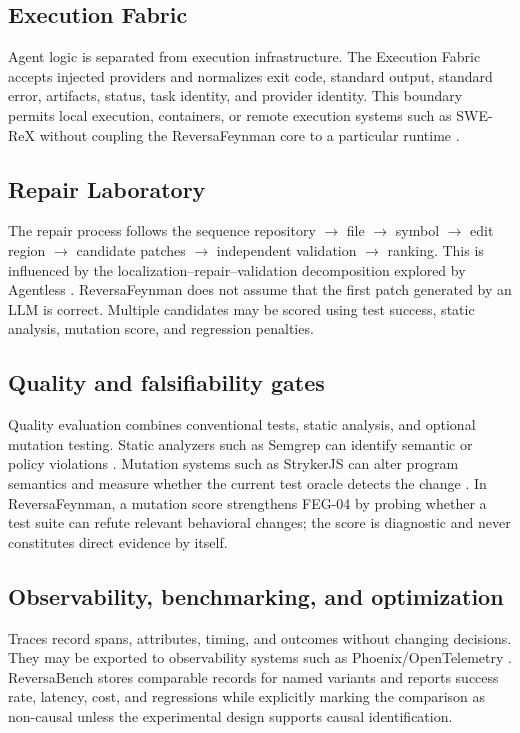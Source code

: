 \subsection{Execution Fabric}

Agent logic is separated from execution infrastructure. The Execution Fabric accepts injected providers and normalizes exit code, standard output, standard error, artifacts, status, task identity, and provider identity. This boundary permits local execution, containers, or remote execution systems such as SWE-ReX without coupling the ReversaFeynman core to a particular runtime \cite{swerex2026}.

\subsection{Repair Laboratory}

The repair process follows the sequence repository $\rightarrow$ file $\rightarrow$ symbol $\rightarrow$ edit region $\rightarrow$ candidate patches $\rightarrow$ independent validation $\rightarrow$ ranking. This is influenced by the localization--repair--validation decomposition explored by Agentless \cite{xia2024agentless}. ReversaFeynman does not assume that the first patch generated by an LLM is correct. Multiple candidates may be scored using test success, static analysis, mutation score, and regression penalties.

\subsection{Quality and falsifiability gates}

Quality evaluation combines conventional tests, static analysis, and optional mutation testing. Static analyzers such as Semgrep can identify semantic or policy violations \cite{semgrep2026}. Mutation systems such as StrykerJS can alter program semantics and measure whether the current test oracle detects the change \cite{stryker2026}. In ReversaFeynman, a mutation score strengthens FEG-04 by probing whether a test suite can refute relevant behavioral changes; the score is diagnostic and never constitutes direct evidence by itself.

\subsection{Observability, benchmarking, and optimization}

Traces record spans, attributes, timing, and outcomes without changing decisions. They may be exported to observability systems such as Phoenix/OpenTelemetry \cite{phoenix2026}. ReversaBench stores comparable records for named variants and reports success rate, latency, cost, and regressions while explicitly marking the comparison as non-causal unless the experimental design supports causal identification.

